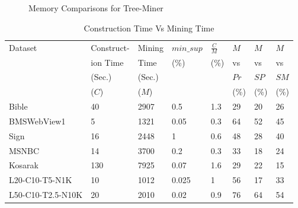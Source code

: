 \begin{figure}[!tb]
\begin{subfigure}{0.4\linewidth}
\begin{adjustbox}{max width=\textwidth}
\end{adjustbox}
\caption{}
\end{subfigure}
        \caption{Memory Comparisons for Tree-Miner}
        \label{graph:memory_comparison_tree_miner}
        \end{figure}

\begin{table}[!htbp]
\centering
\begin{tabular}{|l|l|l|l|l|l|l|l|}
\hline
Dataset & Construct- & Mining & $min\_sup$ & $\frac{C}{M}$ & $ M $ & $M$ & $M$ \\
& ion Time  &  Time & (\%) & (\%) & vs & vs & vs\\
& (Sec.) & (Sec.) & & & $Pr$ & $SP$ & $SM$\\
& ($C$) &  ($M$) & & & (\%) & (\%)&(\%)\\
\hline
 Bible & 40 & 2907 & 0.5 & 1.3 & 29  & 20 & 26\\ \hline
 BMSWebView1 & 5 & 1321 &  0.05 & 0.3 & 64 & 52 & 45\\ \hline
 Sign  &  16  &  2448 & 1 & 0.6 & 48 & 28 & 40\\ \hline
 MSNBC & 14 & 3700 & 0.2 & 0.3 & 33 & 18 & 24\\ \hline
 Kosarak & 130 & 7925 & 0.07 & 1.6 & 29 & 22 & 15\\ \hline
L20-C10-T5-N1K & 10 & 1012 & 0.025 & 1 & 56 & 17 & 33\\ \hline
L50-C10-T2.5-N10K & 20 & 2010 & 0.02 & 0.9 & 76 & 64 & 54\\ \hline
\end{tabular}
\caption{Construction Time Vs Mining Time}
\label{table:construction_time_tree_miner}
\end{table}




